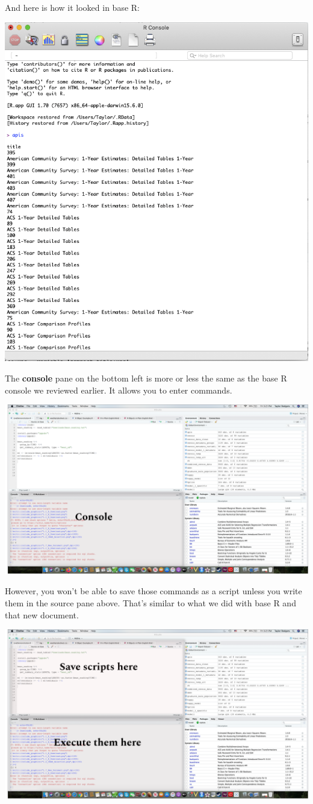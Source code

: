 \documentclass[
]{book}
\begin{document}
And here is how it looked in base R:

\begin{center}\includegraphics[width=0.75\linewidth]{1.9_RConsole_Census} \end{center}

The \textbf{console} pane on the bottom left is more or less the same as the base R console we reviewed earlier. It allows you to enter commands.

\begin{center}\includegraphics[width=0.75\linewidth]{1.17_RStudio_Console} \end{center}

However, you won't be able to save those commands as a script unless you write them in the source pane above. That's similar to what we did with base R and that new document.

\begin{center}\includegraphics[width=0.75\linewidth]{1.18_Console_Source_Comparison} \end{center}
\end{document}
